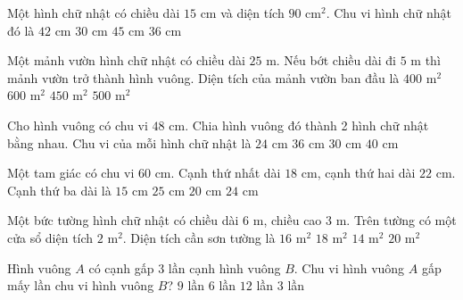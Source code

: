 \begin{ex} %
Một hình chữ nhật có chiều dài $15\text{ cm}$ và diện tích $90\text{ cm}^2$. Chu vi hình chữ nhật đó là
\choice
{\True $42\text{ cm}$}
{$30\text{ cm}$}
{$45\text{ cm}$}
{$36\text{ cm}$}
\end{ex}

\begin{ex} %
Một mảnh vườn hình chữ nhật có chiều dài $25\text{ m}$. Nếu bớt chiều dài đi $5\text{ m}$ thì mảnh vườn trở thành hình vuông. Diện tích của mảnh vườn ban đầu là
\choice
{$400\text{ m}^2$}
{$600\text{ m}^2$}
{$450\text{ m}^2$}
{\True $500\text{ m}^2$}
\end{ex}

\begin{ex} %
Cho hình vuông có chu vi $48\text{ cm}$. Chia hình vuông đó thành 2 hình chữ nhật bằng nhau. Chu vi của mỗi hình chữ nhật là
\choice
{$24\text{ cm}$}
{\True $36\text{ cm}$}
{$30\text{ cm}$}
{$40\text{ cm}$}
\end{ex}

\begin{ex} %
Một tam giác có chu vi $60\text{ cm}$. Cạnh thứ nhất dài $18\text{ cm}$, cạnh thứ hai dài $22\text{ cm}$. Cạnh thứ ba dài là
\choice
{$15\text{ cm}$}
{$25\text{ cm}$}
{\True $20\text{ cm}$}
{$24\text{ cm}$}
\end{ex}

\begin{ex} %
Một bức tường hình chữ nhật có chiều dài $6\text{ m}$, chiều cao $3\text{ m}$. Trên tường có một cửa sổ diện tích $2\text{ m}^2$. Diện tích cần sơn tường là
\choice
{\True $16\text{ m}^2$}
{$18\text{ m}^2$}
{$14\text{ m}^2$}
{$20\text{ m}^2$}
\end{ex}

\begin{ex} %
Hình vuông $A$ có cạnh gấp 3 lần cạnh hình vuông $B$. Chu vi hình vuông $A$ gấp mấy lần chu vi hình vuông $B$?
\choice
{$9$ lần}
{$6$ lần}
{$12$ lần}
{\True $3$ lần}
\end{ex}

